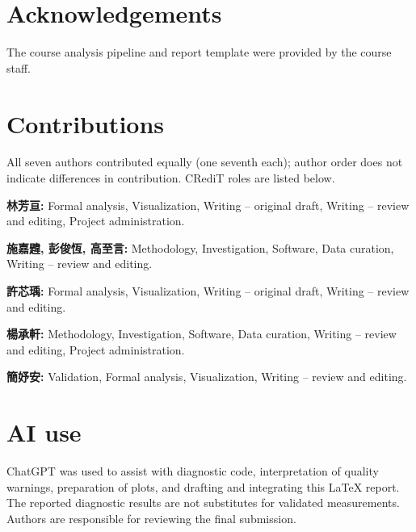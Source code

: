 \documentclass[11pt,a4paper]{article}
\begin{document}
\section*{Acknowledgements}
The course analysis pipeline and report template were provided by the course staff.
\section*{Contributions}
All seven authors contributed equally (one seventh each); author order does not indicate differences in contribution. CRediT roles are listed below.

\textbf{林芳亘:} Formal analysis, Visualization, Writing -- original draft, Writing -- review and editing, Project administration.

\textbf{施嘉韙, 彭俊恆, 高至言:} Methodology, Investigation, Software, Data curation, Writing -- review and editing.

\textbf{許芯瑀:} Formal analysis, Visualization, Writing -- original draft, Writing -- review and editing.

\textbf{楊承軒:} Methodology, Investigation, Software, Data curation, Writing -- review and editing, Project administration.

\textbf{簡妤安:} Validation, Formal analysis, Visualization, Writing -- review and editing.
\section*{AI use}
ChatGPT was used to assist with diagnostic code, interpretation of quality warnings, preparation of plots, and drafting and integrating this LaTeX report. The reported diagnostic results are not substitutes for validated measurements. Authors are responsible for reviewing the final submission.
\printbibliography
\end{document}
